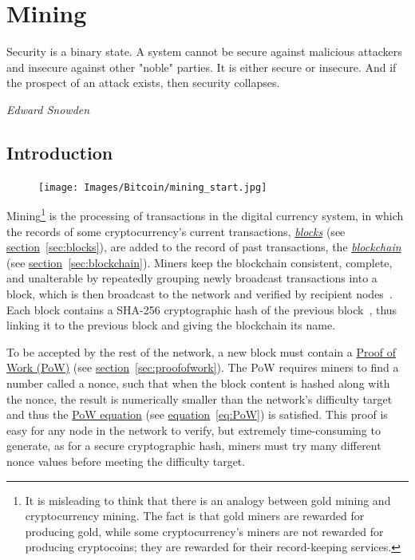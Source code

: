 \chapter{Mining} \label{sec:mining}
%
\epigraph{Security is a binary state. A system cannot be secure against malicious attackers and insecure against other "noble" parties. It is either secure or insecure. And if the prospect of an attack exists, then security collapses.}{\textit{Edward Snowden}}
\section{Introduction}
\setlength{\intextsep}{0pt}
\begin{figure}
\centering
\texttt{[image: Images/Bitcoin/mining\_start.jpg]}
\end{figure}
Mining\footnote{It is misleading to think that there is an analogy between gold mining and cryptocurrency mining. The fact is that gold miners are rewarded for producing gold, while some cryptocurrency's miners are not rewarded for producing cryptocoins; they are rewarded for their record-keeping services.} is the processing of transactions in the digital currency system, in which the records of some cryptocurrency's current  transactions, \hyperref[sec:blocks]{\emph{blocks}} (see \hyperref[sec:blocks]{section}~\ref{sec:blocks}), are added to the record of past transactions, the \hyperref[sec:blockchain]{\emph{blockchain}} (see \hyperref[sec:blockchain]{section}~\ref{sec:blockchain}). Miners keep the blockchain consistent, complete, and unalterable by repeatedly grouping newly broadcast transactions into a block, which is then broadcast to the network and verified by recipient nodes~\cite{economist}. Each block contains a SHA-256 cryptographic hash of the previous block~\cite{economist}, thus linking it to the previous block and giving the blockchain its name.

To be accepted by the rest of the network, a new block must contain a \hyperref[sec:proofofwork]{Proof of Work (PoW)} (see \hyperref[sec:proofofwork]{section}~\ref{sec:proofofwork}). The PoW requires miners to find a number called a nonce, such that when the block content is hashed along with the nonce, the result is numerically smaller than the network's difficulty target~\cite{Nakamoto_bitcoin:a} and thus the \hyperref[eq:PoW]{PoW equation} (see \hyperref[eq:PoW]{equation}~\ref{eq:PoW}) is satisfied. This proof is easy for any node in the network to verify, but extremely time-consuming to generate, as for a secure cryptographic hash, miners must try many different nonce values before meeting the difficulty target.

